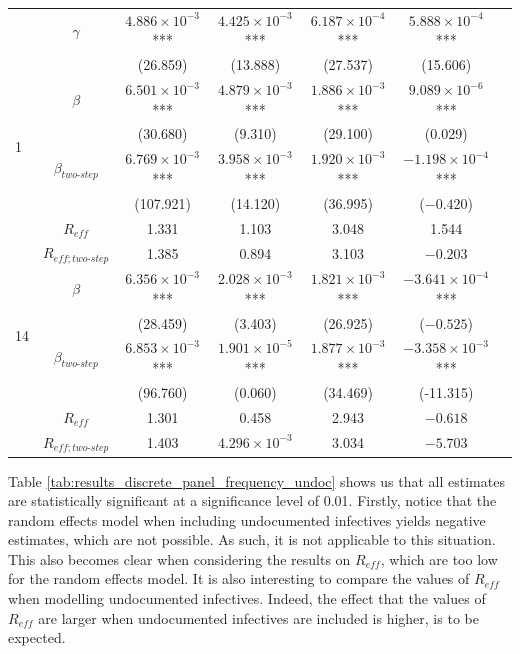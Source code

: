 \documentclass[12pt]{article}
\begin{document}
\begin{appendices}
\begin{longtable}{@{}lcccccc@{}}
    		& $\gamma$ & $4.886 \times 10^{-3}$*** & $4.425 \times 10^{-3}$*** & $6.187 \times 10^{-4}$*** & $5.888 \times 10^{-4}$*** \\ 
             &  & (26.859) & (13.888) & (27.537) & (15.606) \\
    		\midrule
            \multirow{4}{*}{1} & $\beta$ & $6.501 \times 10^{-3}$*** & $4.879 \times 10^{-3}$*** & $1.886 \times 10^{-3}$*** & $9.089 \times 10^{-6}$*** \\  
             &  & (30.680) & (9.310) & (29.100) & (0.029) \\ 
             & $\beta_{two\text{-}step}$ & $6.769 \times 10^{-3}$*** & $3.958 \times 10^{-3}$*** & $1.920 \times 10^{-3}$*** & $-1.198 \times 10^{-4}$*** \\ 
             &  & (107.921) & (14.120) & (36.995) & ($-0.420$) \\
             \cmidrule(lr){2-6}
             & $R_{eff}$ & 1.331 & 1.103 & 3.048 & 1.544 \\
             & $R_{eff;two\text{-}step}$ & 1.385 & 0.894 & 3.103 & $-0.203$ \\
            \midrule
            \multirow{4}{*}{14} & $\beta$ & $6.356 \times 10^{-3}$*** & $2.028 \times 10^{-3}$*** & $1.821 \times 10^{-3}$*** & $-3.641 \times 10^{-4}$*** \\  
             &  & (28.459) & (3.403) & (26.925) & ($-0.525$) \\ 
             & $\beta_{two\text{-}step}$ & $6.853 \times 10^{-3}$*** & $1.901 \times 10^{-5}$*** & $1.877 \times 10^{-3}$*** & $-3.358 \times 10^{-3}$*** \\ 
             &  & (96.760) & (0.060) & (34.469) & (-11.315) \\
             \cmidrule(lr){2-6}
             & $R_{eff}$ & 1.301 & 0.458 & 2.943 & $-0.618$ \\
             & $R_{eff;two\text{-}step}$ & 1.403 & $4.296 \times 10^{-3}$ & 3.034 & $-5.703$ \\* \bottomrule
    	\end{longtable}
    	
    	Table \ref{tab:results_discrete_panel_frequency_undoc} shows us that all estimates are statistically significant at a significance level of 0.01. Firstly, notice that the random effects model when including undocumented infectives yields negative estimates, which are not possible. As such, it is not applicable to this situation. This also becomes clear when considering the results on $R_{eff}$, which are too low for the random effects model. It is also interesting to compare the values of $R_{eff}$ when modelling undocumented infectives. Indeed, the effect that the values of $R_{eff}$ are larger when undocumented infectives are included is higher, is to be expected. \\
    	

\end{appendices}
\end{document}
